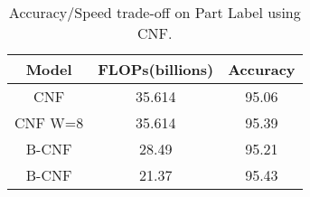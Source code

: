 \begin{table}[h]
\small{
\centering
\begin{tabular}{|c||cc|}
\hline
Model                       & FLOPs(billions) & Accuracy \\ \hline \hline
CNF                         & 35.614          & 95.06    \\ \hline
CNF W=8 \cite{DBLP:journals/corr/SaxenaV16} & 35.614          & 95.39    \\ \hline
B-CNF                       & 28.49           & 95.21    \\
B-CNF                       & 21.37           & 95.43    \\ \hline
\end{tabular}
}
\caption{Accuracy/Speed trade-off on Part Label using CNF.}
\label{tab:partlabels}
\end{table}